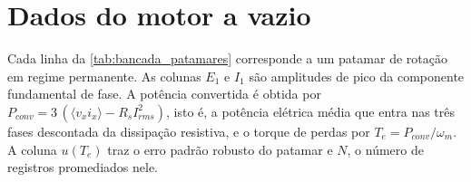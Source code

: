 
\chapter{Dados do motor a vazio}
\label{apendice:bancada}

Cada linha da \autoref{tab:bancada_patamares} corresponde a um patamar de
rotação em regime permanente. As colunas $E_1$ e $I_1$ são amplitudes de pico
da componente fundamental de fase. A potência convertida é obtida por
$P_{conv} = 3\,(\langle v_x i_x\rangle - R_s I_{rms}^2)$, isto é, a potência
elétrica média que entra nas três fases descontada da dissipação resistiva, e
o torque de perdas por $T_e = P_{conv}/\omega_m$. A coluna $u(T_e)$ traz o
erro padrão robusto do patamar e $N$, o número de registros promediados nele.

